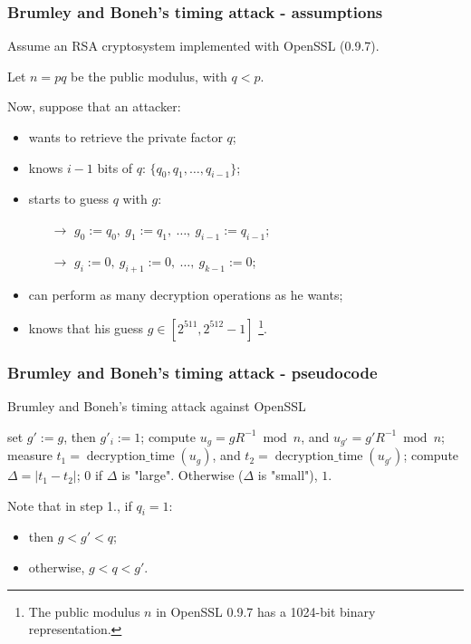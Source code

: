 \documentclass{beamer}
\DeclareMathOperator{\decryptiontime}{decryption\_time}
\begin{document}
\begin{frame}
\frametitle{Brumley and Boneh's timing attack - assumptions}

Assume an RSA cryptosystem implemented with OpenSSL (0.9.7).

Let $n = pq$ be the public modulus, with $q < p$.

Now, suppose that an attacker:

\begin{itemize}
  \item wants to retrieve the private factor $q$;
  \item knows $i - 1$ bits of $q$: $\{q_0, q_1, \dots, q_{i - 1}\}$;
  \item starts to guess $q$ with $g$:
  \begin{itemize}
    \item[$\rightarrow$] $g_0 := q_0,\ g_1 := q_1,\ \dots,\ g_{i - 1} := q_{i - 1}$;
    \item[$\rightarrow$] $g_i := 0,\ g_{i + 1} := 0,\ \dots,\ g_{k - 1} := 0$;
  \end{itemize}
  \item can perform as many decryption operations as he wants;
  \item knows that his guess $g \in [2^{511}, 2^{512} - 1]$ \footnote{The public modulus $n$ in OpenSSL 0.9.7 has a 1024-bit binary representation.}.

\end{itemize}

\end{frame}
\begin{frame}
\frametitle{Brumley and Boneh's timing attack - pseudocode}

\begin{algorithm}[H]
\caption{Brumley and Boneh's timing attack against OpenSSL}\label{alg:three}
\begin{algorithmic}[1]
  \State set $g' := g$, then $g'_i := 1$;
  \State compute $u_g = gR^{-1} \bmod n$, and $u_{g'} = g'R^{-1} \bmod n$;
  \State measure $t_1 = \decryptiontime(u_g)$, and $t_2 = \decryptiontime(u_{g'})$;
  \State compute $\Delta = \left| t_1 - t_2 \right|$;
  \State \Return $0$ if $\Delta$ is "large". Otherwise ($\Delta$ is "small"), \Return $1$.
\end{algorithmic}
\end{algorithm}

Note that in step 1., if $q_i = 1$:
\begin{itemize}
  \item then $g < g' < q$;
  \item otherwise, $g < q < g'$.
\end{itemize}

\end{frame}
\end{document}

